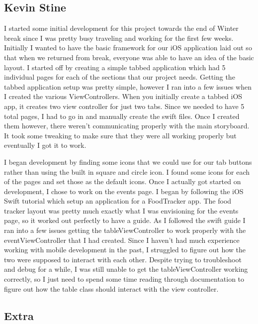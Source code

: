 \documentclass[letterpaper,10pt,draftclsnofoot,onecolumn,titlepage]{IEEEtran}
\begin{document}
	\subsection{Kevin Stine}
	I started some initial development for this project towards the end of Winter break since I was pretty busy traveling and working for the first few weeks.
	Initially I wanted to have the basic framework for our iOS application laid out so that when we returned from break, everyone was able to have an idea of the basic layout.
	I started off by creating a simple tabbed application which had 5 individual pages for each of the sections that our project needs.
	Getting the tabbed application setup was pretty simple, however I ran into a few issues when I created the various ViewControllers.
	When you initially create a tabbed iOS app, it creates two view controller for just two tabs. Since we needed to have 5 total pages, I had to go in and manually create the swift files.
	Once I created them however, there weren't communicating properly with the main storyboard. It took some tweaking to make sure that they were all working properly but eventually I got it to work.

	I began development by finding some icons that we could use for our tab buttons rather than using the built in square and circle icon.
	I found some icons for each of the pages and set those as the default icons.
	Once I actually got started on development, I chose to work on the events page.
	I began by following the iOS Swift tutorial which setup an application for a FoodTracker app. The food tracker layout was pretty much exactly what I was envisioning for the events page, so it worked out perfectly to have a guide.
	As I followed the swift guide I ran into a few issues getting the tableViewController to work properly with the eventViewController that I had created.
	Since I haven't had much experience working with mobile development in the past, I struggled to figure out how the two were supposed to interact with each other.
	Despite trying to troubleshoot and debug for a while, I was still unable to get the tableViewController working correctly, so I just need to spend some time reading through documentation to figure out how the table class should interact with the view controller.
	



	\subsection{Extra}
\end{document}
